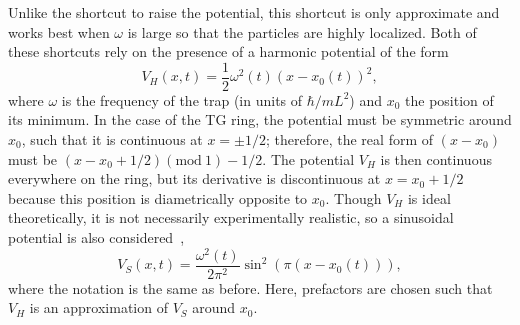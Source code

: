 Unlike the shortcut to raise the potential, this shortcut is only approximate and works best when $\omega$ is large so that the particles are highly localized.
Both of these shortcuts rely on the presence of a harmonic potential of the form
\begin{equation}
 V_{H}(x,t)=\frac 1 2 \omega^2(t) \left( x-x_0(t)\right)^2, 
\end{equation}
where  $\omega$ is the frequency of the trap (in units of $\hbar/mL^2$) and $x_0$ the position of its minimum.
In the case of the TG ring, the potential must be symmetric around $x_0$, such that it is continuous at $x=\pm 1/2$; therefore, the real form of $(x-x_0)$ must be $(x-x_0+1/2)(\mathrm{mod~} 1)-1/2$.
The potential $V_H$ is then continuous everywhere on the ring, but its derivative is discontinuous at $x=x_0+1/2$ because this position is diametrically opposite to $x_0$.
Though $V_H$ is ideal theoretically, it is not necessarily experimentally realistic, so a sinusoidal potential is also considered~\cite{phelan2013,masuda2014},
\begin{equation}
 V_{S}(x,t)= \frac{\omega^2(t)}{2 \pi^2} \sin^2 \left(\pi \left( x-x_0(t)\right) \right) ,
\end{equation}
where the notation is the same as before. 
Here, prefactors are chosen such that $V_{H}$ is an approximation of $V_S$ around $x_0$.

